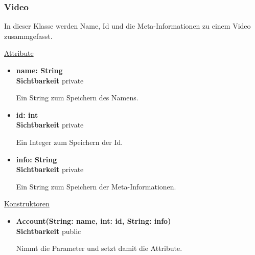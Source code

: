 \newpage
\subsubsection{Video}\label{Video}
In dieser Klasse werden Name, Id und die Meta-Informationen zu einem Video zusammgefasst. \newline

\underline{Attribute}
\begin{itemize}
\itemsep0pt
\item \textbf{name: String} \hfill\\
\textbf{Sichtbarkeit} private

Ein String zum Speichern des Namens.

\item \textbf{id: int} \hfill\\ 
\textbf{Sichtbarkeit} private

Ein Integer zum Speichern der Id.

\item \textbf{info: String} \hfill\\ 
\textbf{Sichtbarkeit} private

Ein String zum Speichern der Meta-Informationen.

\end{itemize}

\underline{Konstruktoren}
\begin{itemize}
\itemsep0pt
\item \textbf{Account(String: name, int: id, String: info)} \hfill\\
\textbf{Sichtbarkeit} public

Nimmt die Parameter und setzt damit die Attribute.
\end{itemize}
